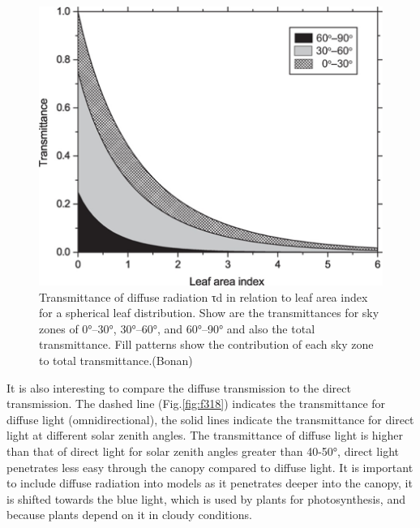 \documentclass[12pt,oneside]{book}
\begin{document}
\begin{figure}

{\centering \includegraphics[width=0.8\linewidth]{figures/chap3/f317_diff_trans} 

}

\caption{Transmittance of diffuse radiation τd in relation to leaf area index for a spherical leaf distribution. Show are the transmittances for sky zones of 0°–30°, 30°–60°, and 60°–90° and also the total transmittance. Fill patterns show the contribution of each sky zone to total transmittance.(Bonan)}\label{fig:f317}
\end{figure}

It is also interesting to compare the diffuse transmission to the direct
transmission. The dashed line (Fig.\ref{fig:f318}) indicates the
transmittance for diffuse light (omnidirectional), the solid lines
indicate the transmittance for direct light at different solar zenith
angles. The transmittance of diffuse light is higher than that of direct
light for solar zenith angles greater than 40-50°, direct light
penetrates less easy through the canopy compared to diffuse light. It is
important to include diffuse radiation into models as it penetrates
deeper into the canopy, it is shifted towards the blue light, which is
used by plants for photosynthesis, and because plants depend on it in
cloudy conditions.
\end{document}
